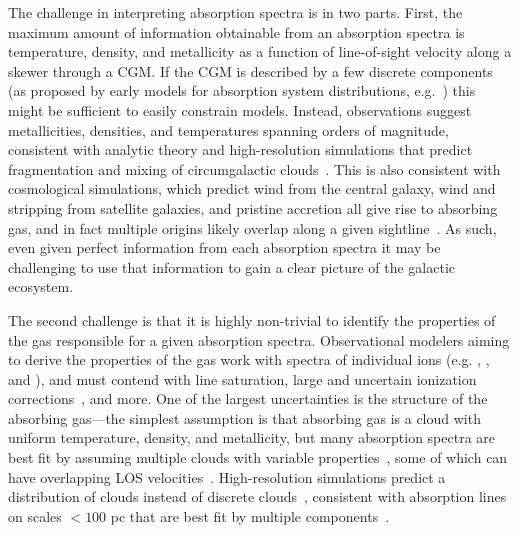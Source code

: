 \documentclass[fleqn,usenatbib]{mnras}
\begin{document}
The challenge in interpreting absorption spectra is in two parts.
First, the maximum amount of information obtainable from an absorption spectra is temperature, density, and metallicity as a function of line-of-sight velocity along a skewer through a CGM.
If the CGM is described by a few discrete components (as proposed by early models for absorption system distributions, e.g.~\citealt{Srianand1994, Das2001, Maller2003}) this might be sufficient to easily constrain models.
Instead, observations suggest metallicities, densities, and temperatures spanning orders of magnitude, consistent with analytic theory and high-resolution simulations that predict fragmentation and mixing of circumgalactic clouds~\citep[][]{Maller2004}.
This is also consistent with cosmological simulations, which predict wind from the central galaxy, wind and stripping from satellite galaxies, and pristine accretion all give rise to absorbing gas, and in fact multiple origins likely overlap along a given sightline~\citep[e.g.][]{Hafen2019, Hafen2020}.
As such, even given perfect information from each absorption spectra it may be challenging to use that information to gain a clear picture of the galactic ecosystem.

The second challenge is that it is highly non-trivial to identify the properties of the gas responsible for a given absorption spectra.
Observational modelers aiming to derive the properties of the gas work with spectra of individual ions (e.g. , , and ), and must contend with line saturation, large and uncertain ionization corrections~\citep[e.g.][]{Schaye2006, Acharya2021}, and more.
One of the largest uncertainties is the structure of the absorbing gas---the simplest assumption is that absorbing gas is a cloud with uniform temperature, density, and metallicity, but many absorption spectra are best fit by assuming multiple clouds with variable properties~\citep[e.g.][]{Boksenberg1979, Muzahid2015, Liang2017, Liang2018, Haislmaier2021, Sameer2021, Zahedy2021, Marra2021}, some of which can have overlapping LOS velocities~\citep[e.g.][]{Marra2022}.
High-resolution simulations predict a distribution of clouds instead of discrete clouds~\citep[e.g.][]{Fielding2020, Vijayan2021}, consistent with absorption lines on scales $<100$ pc that are best fit by multiple components~\citep[e.g.][]{Welsh2010}.
\end{document}
